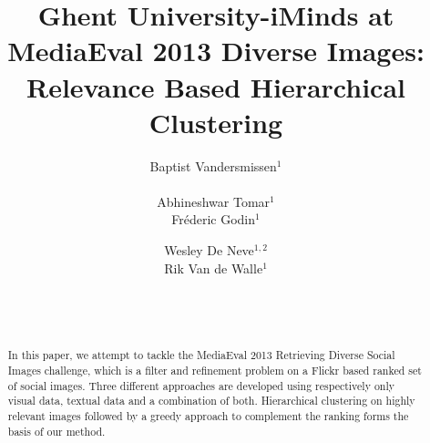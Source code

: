 \documentclass{acm_proc_article-me11_tweaked}
\begin{document}

\title{Ghent University-iMinds at MediaEval 2013 Diverse Images: Relevance Based Hierarchical Clustering}

\author{
\alignauthor
Baptist Vandersmissen$^1$\\
\\    
\alignauthor
Abhineshwar Tomar$^1$ \\
\alignauthor
Fr\'ederic Godin$^1$\\
\and  %
\alignauthor
Wesley De Neve$^{1,2}$\\
\alignauthor
Rik Van de Walle$^1$\\
\and
\\
\\ 
}
\maketitle
  \begin{abstract}
In this paper, we attempt to tackle the MediaEval 2013 Retrieving Diverse Social Images challenge, which is a filter and refinement problem on a Flickr based ranked set of social images.
Three different approaches are developed using respectively only visual data, textual data and a combination of both.
Hierarchical clustering on highly relevant images followed by a greedy approach to complement the ranking forms the basis of our method.
\end{abstract}
% 
% 
\end{document}
